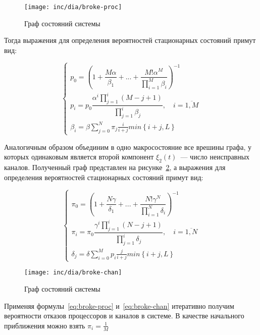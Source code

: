 \documentclass[utf8x, 12pt]{G7-32} %
\begin{document}
\begin{figure}[ht]
\centering
\texttt{[image: inc/dia/broke-proc]}
\caption{Граф состояний системы}
\label{fig:broke-proc}
\end{figure}

Тогда выражения для определения вероятностей стационарных состояний примут вид:

\begin{equation}
\label{eq:broke-proc}
\left\{
   \begin{array}{lcl}
	p_{0} = \left( 1 + \dfrac{M \alpha}{\beta_1} +  ... + \dfrac{M! \alpha^{M}}{\prod \limits_{i=1}^M \beta_i} \right) ^{-1} \\
	p_{i} = p_{0} \dfrac{\alpha^{i}\prod \limits_{j=1}^{i} (M-j+1)}{\prod \limits_{j=1}^i \beta_{j}}, \quad i = \overline{1,M}  \\ 
	\beta_i=\beta\sum\limits_{j=0}^N\pi_j\frac{i}{i+j}min\left\lbrace i+j,L\right\rbrace
   \end{array}
\right.
\end{equation}
 
Аналогичным образом объединим в одно макросостояние все врешины графа, у которых одинаковым является второй компонент $\xi_{2}(t)$~--- число неисправных каналов. Полученный граф представлен на рисунке~\ref{fig:broke-chan}, а выражения для определения вероятностей стационарных состояний примут вид:

\begin{equation}
\label{eq:broke-chan}
\left\{
   \begin{array}{lcl}
	\pi_{0} = \left( 1 + \dfrac{N \gamma}{\delta_1} +  ... + \dfrac{N! \gamma^{N}}{\prod \limits_{i=1}^N \delta_i} \right) ^{-1} \\
	\pi_{i} = \pi_{0} \dfrac{\gamma^{i}\prod \limits_{j=1}^{i} (N-j+1)}{\prod \limits_{j=1}^i \delta_{j}}, \quad i = \overline{1,N}  \\ 
	\delta_j=\delta\sum\limits_{i=0}^M p_i\frac{j}{i+j}min\left\lbrace i+j,L\right\rbrace
   \end{array}
\right.
\end{equation}

\begin{figure}[ht]
\centering
\texttt{[image: inc/dia/broke-chan]}
\caption{Граф состояний системы}
\label{fig:broke-chan}
\end{figure}

Применяя формулы~\ref{eq:broke-proc} и~\ref{eq:broke-chan} итеративно получим вероятности отказов процессоров и каналов в системе. В качестве начального приближения можно взять $\pi_i=\frac{1}{M}$
\end{document}
